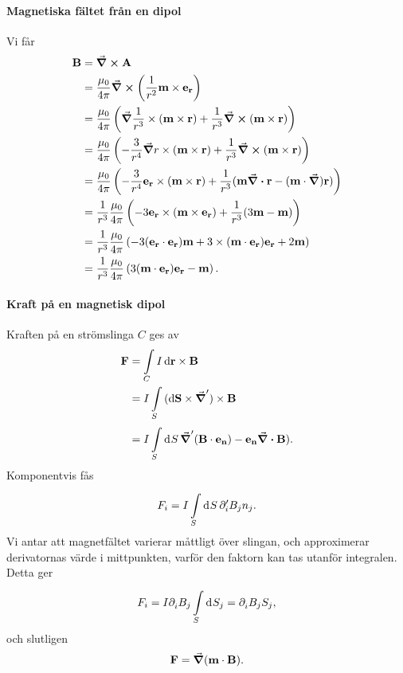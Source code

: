 \paragraph{Magnetiska fältet från en dipol}
Vi får
\begin{align*}
	\vb{B} &= \curl{\vb{A}} \\
	       &= \frac{\mu_{0}}{4\pi}\curl(\frac{1}{r^{2}}\vb{m}\times\vb{e}_{\vb{r}}) \\
	       &= \frac{\mu_{0}}{4\pi}\left(\grad{\frac{1}{r^{3}}}\times(\vb{m}\times\vb{r}) + \frac{1}{r^{3}}\curl(\vb{m}\times\vb{r})\right) \\
	       &= \frac{\mu_{0}}{4\pi}\left(-\frac{3}{r^{4}}\grad{r}\times(\vb{m}\times\vb{r}) + \frac{1}{r^{3}}\curl(\vb{m}\times\vb{r})\right) \\
	       &= \frac{\mu_{0}}{4\pi}\left(-\frac{3}{r^{4}}\vb{e}_{\vb{r}}\times(\vb{m}\times\vb{r}) + \frac{1}{r^{3}}(\vb{m}\div{\vb{r}}  - (\vb{m}\cdot\grad)\vb{r})\right) \\
	       &= \frac{1}{r^{3}}\frac{\mu_{0}}{4\pi}\left(-3\vb{e}_{\vb{r}}\times(\vb{m}\times\vb{e}_{\vb{r}}) + \frac{1}{r^{3}}(3\vb{m}  - \vb{m})\right) \\
	       &= \frac{1}{r^{3}}\frac{\mu_{0}}{4\pi}\left(-3(\vb{e}_{\vb{r}}\cdot\vb{e}_{\vb{r}})\vb{m} + 3\times(\vb{m}\cdot\vb{e}_{\vb{r}})\vb{e}_{\vb{r}} + 2\vb{m}\right) \\
	       &= \frac{1}{r^{3}}\frac{\mu_{0}}{4\pi}\left(3(\vb{m}\cdot\vb{e}_{\vb{r}})\vb{e}_{\vb{r}} - \vb{m}\right).
\end{align*}

\paragraph{Kraft på en magnetisk dipol}
Kraften på en strömslinga $C$ ges av
\begin{align*}
	\vb{F} &= \int\limits_{C}{I\dd{\vb{r}}\times\vb{B}} \\
	       &= I\int\limits_{S}{(\dd{\vb{S}}\times\grad')\times\vb{B}} \\
	       &= I\int\limits_{S}^{}\dd[]{S}\grad'(\vb{B}\cdot\vb{e}_{\vb{n}}) - \vb{e}_{\vb{n}}\div{\vb{B}}).
\end{align*}
Komponentvis fås
\begin{align*}
	F_{i} = I\int\limits_{S}^{}\dd[]{S}\partial_{i}'B_{j}n_{j}.
\end{align*}
Vi antar att magnetfältet varierar måttligt över slingan, och approximerar derivatornas värde i mittpunkten, varför den faktorn kan tas utanför integralen. Detta ger
\begin{align*}
	F_{i} = I\partial_{i}^{}B_{j}\int\limits_{S}^{}\dd[]{S_{j}} = \partial_{i}^{}B_{j}S_{j},
\end{align*}
och slutligen
\begin{align*}
	\vb{F} = \grad(\vb{m}\cdot\vb{B}).
\end{align*}

